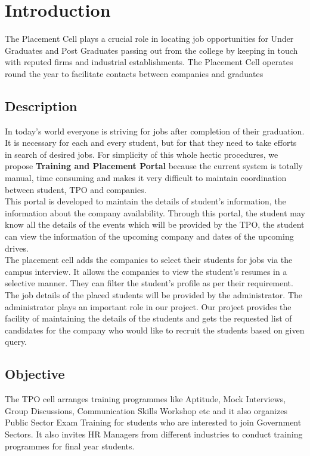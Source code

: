 \chapter{Introduction}

\par The Placement Cell plays a crucial role in locating job opportunities for Under Graduates and Post Graduates passing out from the college by keeping in touch with reputed firms and industrial establishments. The Placement Cell operates round the year to facilitate contacts between companies and graduates
\\

\section{Description}
\hspace{5mm} In today’s world everyone is striving for jobs after completion of their graduation. It is necessary for each and every student, but for that they need to take efforts in search of desired jobs. For simplicity of this whole hectic procedures, we propose \textbf{Training and Placement Portal} because the current system is totally manual, time consuming and makes it very difficult to maintain coordination between student, TPO and companies. \\

This portal is developed to maintain the details of student's information, the information about the company availability. Through this portal, the student may know all the details of the events which will be provided by the TPO, the student can view the information of the upcoming company and dates of the upcoming drives.\\ 

The placement cell adds the companies to select their students for jobs via the campus interview. It allows the companies to view the student’s resumes in a selective manner. They can filter the student’s profile as per their requirement. The job details of the placed students will be provided by the administrator. The administrator plays an important role in our project. Our project provides the facility of maintaining the details of the students and gets the requested list of candidates for the company who would like to recruit the students based on given query.
\pagebreak

\section{Objective}
 \par The TPO cell arranges training programmes like Aptitude, Mock Interviews, Group Discussions, Communication Skills Workshop etc and it also organizes Public Sector Exam Training for students who are interested to join Government Sectors. It also invites HR Managers from different industries to conduct training programmes for final year students.\\
 
